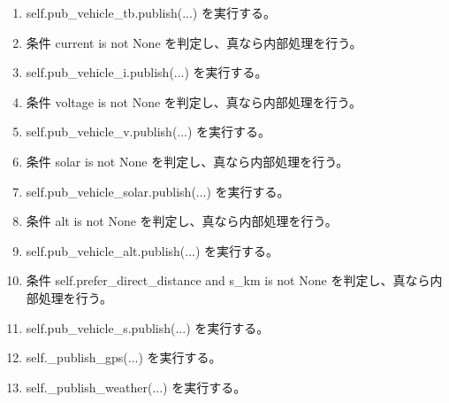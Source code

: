 \documentclass[a4paper,11pt]{article}
\begin{document}
\begin{enumerate}[leftmargin=1.8em]
\item   self.pub\_vehicle\_tb.publish(...) を実行する。
\item 条件 current is not None を判定し、真なら内部処理を行う。
\item   self.pub\_vehicle\_i.publish(...) を実行する。
\item 条件 voltage is not None を判定し、真なら内部処理を行う。
\item   self.pub\_vehicle\_v.publish(...) を実行する。
\item 条件 solar is not None を判定し、真なら内部処理を行う。
\item   self.pub\_vehicle\_solar.publish(...) を実行する。
\item 条件 alt is not None を判定し、真なら内部処理を行う。
\item   self.pub\_vehicle\_alt.publish(...) を実行する。
\item 条件 self.prefer\_direct\_distance and s\_km is not None を判定し、真なら内部処理を行う。
\item   self.pub\_vehicle\_s.publish(...) を実行する。
\item self.\_publish\_gps(...) を実行する。
\item self.\_publish\_weather(...) を実行する。
            \end{enumerate}
\end{document}
